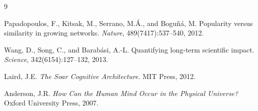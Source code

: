 \documentclass[11pt]{article}
\begin{document}

\begin{thebibliography}{9}

Papadopoulos, F., Kitsak, M., Serrano, M.\'{A}., and Bogu\~{n}\'{a}, M.
\newblock Popularity versus similarity in growing networks.
\newblock \emph{Nature}, 489(7417):537--540, 2012.

Wang, D., Song, C., and Barab\'{a}si, A.-L.
\newblock Quantifying long-term scientific impact.
\newblock \emph{Science}, 342(6154):127--132, 2013.

Laird, J.E.
\newblock \emph{The Soar Cognitive Architecture}.
\newblock MIT Press, 2012.

Anderson, J.R.
\newblock \emph{How Can the Human Mind Occur in the Physical Universe?}
\newblock Oxford University Press, 2007.

\end{thebibliography}
\end{document}
